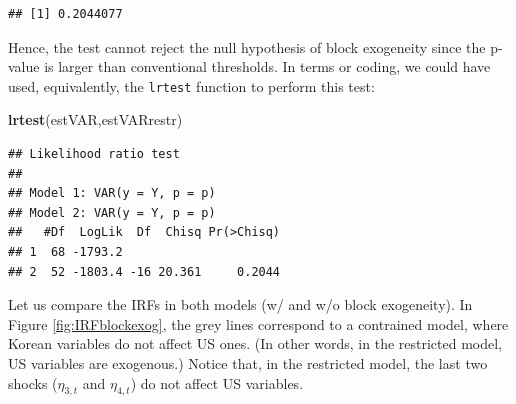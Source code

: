 \documentclass[
  12pt,
]{book}
\newenvironment{Shaded}{\begin{snugshade}}{\end{snugshade}}
\newcommand{\FunctionTok}[1]{\textcolor[rgb]{0.13,0.29,0.53}{\textbf{#1}}}
\newcommand{\NormalTok}[1]{#1}
\theoremstyle{definition}
\theoremstyle{definition}
\theoremstyle{definition}
\theoremstyle{definition}
\theoremstyle{remark}
\begin{document}
\begin{verbatim}
## [1] 0.2044077
\end{verbatim}

Hence, the test cannot reject the null hypothesis of block exogeneity since the p-value is larger than conventional thresholds. In terms or coding, we could have used, equivalently, the \texttt{lrtest} function to perform this test:

\begin{Shaded}
\begin{Highlighting}[]
\FunctionTok{lrtest}\NormalTok{(estVAR,estVARrestr)}
\end{Highlighting}
\end{Shaded}

\begin{verbatim}
## Likelihood ratio test
## 
## Model 1: VAR(y = Y, p = p)
## Model 2: VAR(y = Y, p = p)
##   #Df  LogLik  Df  Chisq Pr(>Chisq)
## 1  68 -1793.2                      
## 2  52 -1803.4 -16 20.361     0.2044
\end{verbatim}

Let us compare the IRFs in both models (w/ and w/o block exogeneity). In Figure \ref{fig:IRFblockexog}, the grey lines correspond to a contrained model, where Korean variables do not affect US ones. (In other words, in the restricted model, US variables are exogenous.) Notice that, in the restricted model, the last two shocks (\(\eta_{3,t}\) and \(\eta_{4,t}\)) do not affect US variables.
\end{document}
